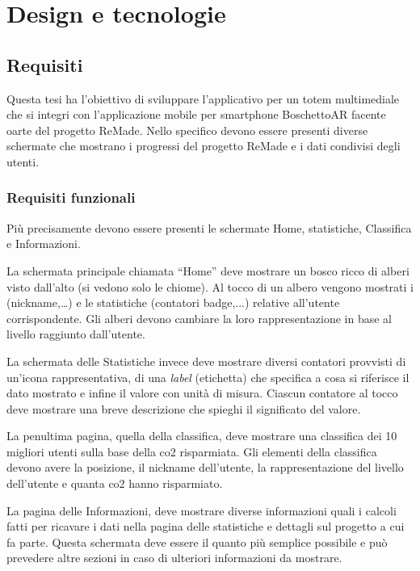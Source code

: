 \chapter{Design e tecnologie}
\section{Requisiti}
Questa tesi ha l'obiettivo di sviluppare l'applicativo per un totem multimediale che si integri con l'applicazione mobile per smartphone BoschettoAR facente oarte del progetto ReMade.
Nello specifico devono essere presenti diverse schermate che mostrano i progressi del progetto ReMade e i dati condivisi degli utenti.
%
\subsection{Requisiti funzionali}
Più precisamente devono essere presenti le schermate Home, statistiche, Classifica e Informazioni.

La schermata principale chiamata \enquote{Home} deve mostrare un bosco ricco di alberi visto dall'alto (si vedono solo le chiome). Al tocco di un albero vengono mostrati i  (nickname,\dots) e le statistiche (contatori badge,...) relative all'utente corrispondente. Gli alberi devono cambiare la loro rappresentazione in base al livello raggiunto dall'utente.

La schermata delle Statistiche invece deve mostrare diversi contatori provvisti di un'icona rappresentativa, di una \textit{label} (etichetta) che specifica a cosa si riferisce il dato mostrato e infine il valore con unità di misura. Ciascun contatore al tocco deve mostrare una breve descrizione che spieghi il significato del valore.

La penultima pagina, quella della classifica, deve mostrare una classifica dei 10 migliori utenti sulla base della co2 risparmiata.
Gli elementi della classifica devono avere la posizione, il nickname dell'utente, la rappresentazione del livello dell'utente e quanta co2 hanno risparmiato.

La pagina delle Informazioni, deve mostrare diverse informazioni quali i calcoli fatti per ricavare i dati nella pagina delle statistiche e dettagli sul progetto a cui fa parte. Questa schermata deve essere il quanto più semplice possibile e può prevedere altre sezioni in caso di ulteriori informazioni da mostrare.


